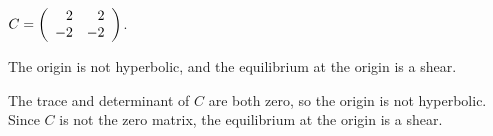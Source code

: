 \documentclass{ximera}
\begin{document}
\begin{exercise}  \label{E:PQf}
$C = \left(\begin{array}{rr} 2 & 2\\ -2 &-2\end{array}\right)$.

\begin{solution}
\ans The origin is not hyperbolic, and the equilibrium at
the origin is a shear.

\soln The trace and determinant of $C$ are both zero, so the origin
is not hyperbolic.  Since $C$ is not the zero matrix, the equilibrium
at the origin is a shear.

\end{solution}
\end{exercise}
\end{document}

